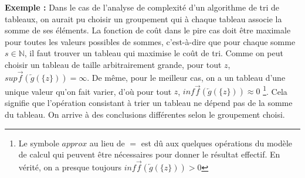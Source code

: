 \documentclass[../../../main.tex]{subfiles}
\begin{document}
\textbf{Exemple :} Dans le cas de l'analyse de complexité d'un algorithme de tri de tableaux, on aurait pu choisir un groupement qui à chaque tableau associe la somme de ses éléments. La fonction de coût dans le pire cas doit être maximale pour toutes les valeurs possibles de sommes, c'est-à-dire que pour chaque somme $s\in\mathbb{N}$, il faut trouver un tableau qui maximise le coût de tri. Comme on peut choisir un tableau de taille arbitrairement grande, pour tout $z$, $sup \overrightarrow{f}\left(\overleftarrow{g}\left(\{z\}\right)\right) = \infty$. De même, pour le meilleur cas, on a un tableau d'une unique valeur qu'on fait varier, d'où pour tout $z$, $inf \overrightarrow{f}\left(\overleftarrow{g}\left(\{z\}\right)\right) \approx 0$ \footnote{Le symbole $approx$  au lieu de $=$ est dû aux quelques opérations du modèle de calcul qui peuvent être nécessaires pour donner le résultat effectif. En vérité, on a presque toujours $inf \overrightarrow{f}\left(\overleftarrow{g}\left(\{z\}\right)\right) > 0$}. Cela signifie que l'opération consistant à trier un tableau ne dépend pas de la somme du tableau. On arrive à des conclusions différentes selon le groupement choisi.
\end{document}
